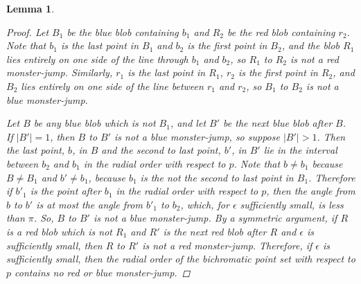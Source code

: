 \documentclass[12pt]{article}
\newtheorem{lemma}{Lemma}
\theoremstyle{definition}
\begin{document}
\begin{lemma}
\begin{proof}
    Let $B_1$ be the blue blob containing $b_1$ and $R_2$ be the red blob containing $r_2$.
    Note that $b_1$ is the last point in $B_1$ and $b_2$ is the first point in $B_2$, and the blob $R_1$ lies entirely on one side of the line through $b_1$ and $b_2$, so $R_1$ to $R_2$ is not a red monster-jump.
    Similarly, $r_1$ is the last point in $R_1$, $r_2$ is the first point in $R_2$, and $B_2$ lies entirely on one side of the line between $r_1$ and $r_2$, so $B_1$ to $B_2$ is not a blue monster-jump.
    
    Let $B$ be any blue blob which is not $B_1$, and let $B'$ be the next blue blob after $B$.
    If $|B'|=1$, then $B$ to $B'$ is not a blue monster-jump, so suppose $|B'|>1$.
    Then the last point, $b$, in $B$ and the second to last point, $b'$, in $B'$ lie in the interval between $b_2$ and $b_1$ in the radial order with respect to $p$.
    Note that $b\neq b_1$ because $B\neq B_1$ and $b'\neq b_1$, because $b_1$ is the not the second to last point in $B_1$.
    Therefore if $b'_1$ is the point after $b_1$ in the radial order with respect to $p$, then the angle from $b$ to $b'$ is at most the angle from $b'_1$ to $b_2$, which, for $\epsilon$ sufficiently small, is less than $\pi$.
    So, $B$ to $B'$ is not a blue monster-jump.
    By a symmetric argument, if $R$ is a red blob which is not $R_1$ and $R'$ is the next red blob after $R$ and $\epsilon$ is sufficiently small, then $R$ to $R'$ is not a red monster-jump.
    Therefore, if $\epsilon$ is sufficiently small, then the radial order of the bichromatic point set with respect to $p$ contains no red or blue monster-jump.
  \end{proof}
\end{lemma}
\end{document}
